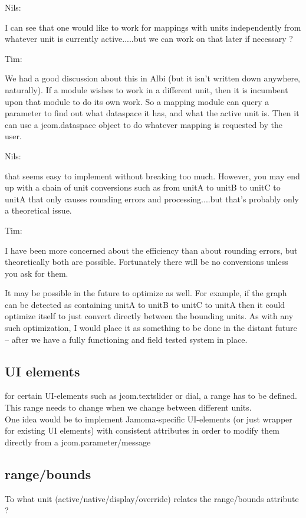 \documentclass[]{article}
\begin{document}
Nils:

I can see that one would like to work for mappings with units independently from whatever unit is currently active.....but we can work on that later if necessary ?

Tim:

We had a good discussion about this in Albi (but it isn't written down anywhere, naturally).  If a module wishes to work in a different unit, then it is incumbent upon that module to do its own work.  So a mapping module can query a parameter to find out what dataspace it has, and what the active unit is.  Then it can use a jcom.dataspace object to do whatever mapping is requested by the user.

Nils:

that seems easy to implement without breaking too much. However, you may end up with a chain of unit conversions such as from unitA to unitB to unitC to unitA that only causes rounding errors and processing....but that's probably only a theoretical issue.

Tim:

I have been more concerned about the efficiency than about rounding errors, but theoretically both are possible.  Fortunately there will be no conversions unless you ask for them.  

It may be possible in the future to optimize as well.  For example, if the graph can be detected as containing unitA to unitB to unitC to unitA then it could optimize itself to just convert directly between the bounding units.  As with any such optimization, I would place it as something to be done in the distant future -- after we have a fully functioning and field tested system in place.
 
\subsection{UI elements}
for certain UI-elements such as jcom.textslider or dial, a range has to be defined. This range needs to change when we change between different units.\\
One idea would be to implement Jamoma-specific UI-elements (or just wrapper for existing UI elements) with consistent attributes in order to modify them directly from a jcom.parameter/message                                                                                                                                               

\subsection{range/bounds}
To what unit (active/native/display/override) relates the range/bounds attribute ?
\end{document}
